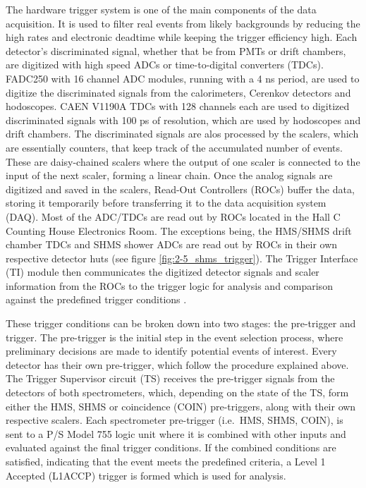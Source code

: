 \documentclass[
]{report}
\begin{document}
The hardware trigger system is one of the main components of the data
acquisition. It is used to filter real events from likely backgrounds by
reducing the high rates and electronic deadtime while keeping the
trigger efficiency high. Each detector's discriminated signal, whether
that be from PMTs or drift chambers, are digitized with high speed ADCs
or time-to-digital converters (TDCs). FADC250 with 16 channel ADC
modules, running with a 4 ns period, are used to digitize the
discriminated signals from the calorimeters, Cerenkov detectors and
hodoscopes. CAEN V1190A TDCs with 128 channels each are used to
digitized discriminated signals with 100 ps of resolution, which are
used by hodoscopes and drift chambers. The discriminated signals are
alos processed by the scalers, which are essentially counters, that keep
track of the accumulated number of events. These are daisy-chained
scalers where the output of one scaler is connected to the input of the
next scaler, forming a linear chain. Once the analog signals are
digitized and saved in the scalers, Read-Out Controllers (ROCs) buffer
the data, storing it temporarily before transferring it to the data
acquisition system (DAQ). Most of the ADC/TDCs are read out by ROCs
located in the Hall C Counting House Electronics Room. The exceptions
being, the HMS/SHMS drift chamber TDCs and SHMS shower ADCs are read out
by ROCs in their own respective detector huts (see figure
\ref{fig:2-5_shms_trigger}). The Trigger Interface (TI) module then
communicates the digitized detector signals and scaler information from
the ROCs to the trigger logic for analysis and comparison against the
predefined trigger conditions \cite{pooserPrivateConversation2018}
\cite{yeroHall12GeV2019}.



These trigger conditions can be broken down into two stages: the
pre-trigger and trigger. The pre-trigger is the initial step in the
event selection process, where preliminary decisions are made to
identify potential events of interest. Every detector has their own
pre-trigger, which follow the procedure explained above. The Trigger
Supervisor circuit (TS) receives the pre-trigger signals from the
detectors of both spectrometers, which, depending on the state of the
TS, form either the HMS, SHMS or coincidence (COIN) pre-triggers, along
with their own respective scalers. Each spectrometer pre-trigger
(i.e.~HMS, SHMS, COIN), is sent to a P/S Model 755 logic unit where it
is combined with other inputs and evaluated against the final trigger
conditions. If the combined conditions are satisfied, indicating that
the event meets the predefined criteria, a Level 1 Accepted (L1ACCP)
trigger is formed which is used for analysis.
\end{document}
